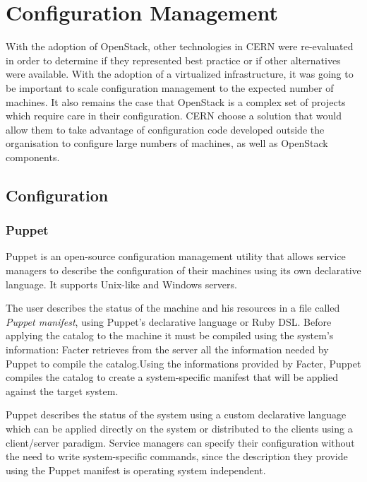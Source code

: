 \section{Configuration Management}

With the adoption of OpenStack, other technologies in CERN were 
re-evaluated in order to determine if they represented best practice or
if other alternatives were available. With the adoption of a virtualized
infrastructure, it was going to be important to scale configuration
management to the expected number of machines. It also remains the case
that OpenStack is a complex set of projects which require care in their
configuration. CERN choose a solution that would allow them to take
advantage of configuration code developed outside the organisation to
configure large numbers of machines, as well as OpenStack components.

\subsection{Configuration}

\subsubsection{Puppet}

Puppet \cite{PuppetWebsite} is an open-source configuration management
utility that allows service managers to describe the configuration of
their machines using its own declarative language. It supports Unix-like
and Windows servers.

The user describes the status of the machine and his resources in a file
called \textit{Puppet manifest}, using Puppet's declarative language or
Ruby DSL. Before applying the catalog to the machine it must be compiled
using the system's information: Facter \cite{FacterWebsite} retrieves from
the server all the information needed by Puppet to compile the
catalog.Using the informations provided by Facter, Puppet compiles the
catalog to create a system-specific manifest that will be applied against
the target system.

Puppet describes the status of the system using a custom declarative
language which can be applied directly on the system or distributed to the
clients using a client/server paradigm. Service managers can specify their
configuration without the need to write system-specific commands, since
the description they provide using the Puppet manifest is operating system
independent.


